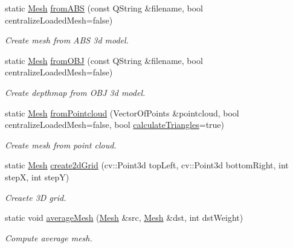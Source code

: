 \begin{DoxyCompactItemize}
\item 
static \hyperlink{class_mesh}{Mesh} \hyperlink{class_mesh_a76fdd1e644b1154f5b0d37e8631cef94}{from\+A\+B\+S} (const Q\+String \&filename, bool centralize\+Loaded\+Mesh=false)
\begin{DoxyCompactList}\small\item\em Create mesh from A\+B\+S 3d model. \end{DoxyCompactList}\item 
static \hyperlink{class_mesh}{Mesh} \hyperlink{class_mesh_aebd86dfd1696005226e3d7672942e54f}{from\+O\+B\+J} (const Q\+String \&filename, bool centralize\+Loaded\+Mesh=false)
\begin{DoxyCompactList}\small\item\em Create depthmap from O\+B\+J 3d model. \end{DoxyCompactList}\item 
static \hyperlink{class_mesh}{Mesh} \hyperlink{class_mesh_a406020ec939773954b3be638041573cc}{from\+Pointcloud} (Vector\+Of\+Points \&pointcloud, bool centralize\+Loaded\+Mesh=false, bool \hyperlink{class_mesh_ad69edfbb7cde40edb166831358e0e5ac}{calculate\+Triangles}=true)
\begin{DoxyCompactList}\small\item\em Create mesh from point cloud. \end{DoxyCompactList}\item 
static \hyperlink{class_mesh}{Mesh} \hyperlink{class_mesh_a07d0c4f5d683e4adda0e93c8578eb285}{create2d\+Grid} (cv\+::\+Point3d top\+Left, cv\+::\+Point3d bottom\+Right, int step\+X, int step\+Y)
\begin{DoxyCompactList}\small\item\em Creaete 3\+D grid. \end{DoxyCompactList}\item 
static void \hyperlink{class_mesh_a7644d8304dc1cac1e0ca30b75459610a}{average\+Mesh} (\hyperlink{class_mesh}{Mesh} \&src, \hyperlink{class_mesh}{Mesh} \&dst, int dst\+Weight)
\begin{DoxyCompactList}\small\item\em Compute average mesh. \end{DoxyCompactList}\end{DoxyCompactItemize}
